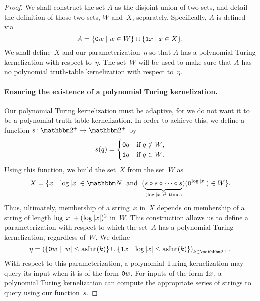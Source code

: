 \begin{proof}
  We shall construct the set $A$ as the disjoint union of two sets, and detail the definition of those two sets, $W$ and~$X$, separately.
  Specifically, $A$ is defined via
  \begin{equation*}
    A = \{\textnormal{\texttt{0}}w \;|\; w \in W\} \cup \{\textnormal{\texttt{1}}x \;|\; x \in X\}.
  \end{equation*}
  We shall define~$X$ and our parameterization~$\eta$ so that $A$ has a polynomial Turing kernelization with respect to~$\eta$.
  The set~$W$ will be used to make sure that $A$ has no polynomial truth-table kernelization with respect to~$\eta$.

  \paragraph{Ensuring the existence of a polynomial Turing kernelization.}
  Our polynomial Turing kernelization must be adaptive, for we do not want it to be a polynomial truth-table kernelization.
  In order to achieve this, we define a function $s\colon \binary^+ \to \binary^+$ by
  \begin{equation*}
    s(q) = \begin{cases}
      \textnormal{\texttt{0}}q	& \text{if $q \notin W$}, \\
      \textnormal{\texttt{1}}q	& \text{if $q \in W$}.
    \end{cases}
  \end{equation*}
  Using this function, we build the set~$X$ from the set~$W$ as
  \begin{equation*}
    X \deq \{x \st \log\length{x} \in \bbN \reland (\underbrace{\vphantom{()}s \circ s \circ \cdots \circ s}_{(\log\length{x})^2\text{ times}})(\bits{0}^{\log\length{x}}) \in W\}.
  \end{equation*}
  Thus, ultimately, membership of a string~$x$ in~$X$ depends on membership of a string of length $\log{\lvert x\rvert} + (\log{\lvert x\rvert})^2$ in~$W$.
  This construction allows us to define a parameterization with respect to which the set~$A$ has a polynomial Turing kernelization, regardless of~$W$.
  We define
  \begin{equation*}
    \eta \deq \left(\{\bits{0}w \st \length{w} \le \asNat(k)\} \cup \{\bits{1}x \st \log\length{x} \le \asNat(k)\}\right)_{k \in \binary^+}.
  \end{equation*}
  With respect to this parameterization, a polynomial Turing kernelization may query its input when it is of the form $\textnormal{\texttt{0}}w$.
  For inputs of the form $\textnormal{\texttt{1}}x$, a polynomial Turing kernelization can compute the appropriate series of strings to query using our function~$s$.

\end{proof}
